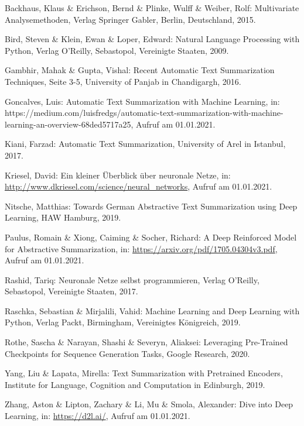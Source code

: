 \setcounter{page}{50}

\begin{thebibliography}{50}
\thispagestyle{fancy}

Backhaus, Klaus \& Erichson, Bernd \& Plinke, Wulff \& Weiber, Rolf: Multivariate Analysemethoden, Verlag Springer Gabler, Berlin, Deutschland, 2015.

Bird, Steven \& Klein, Ewan \& Loper, Edward: Natural Language Processing with Python, Verlag O'Reilly, Sebastopol, Vereinigte Staaten, 2009.

Gambhir, Mahak \& Gupta, Vishal: Recent Automatic Text Summarization Techniques, Seite 3-5, University of Panjab in Chandigargh, 2016.

Goncalves, Luis: Automatic Text Summarization with Machine Learning, in: https://medium.com/luisfredgs/automatic-text-summarization-with-machine-learning-an-overview-68ded5717a25, Aufruf am 01.01.2021.

Kiani, Farzad: Automatic Text Summarization, University of Arel in Istanbul, 2017.

Kriesel, David: Ein kleiner Überblick über neuronale Netze, in: \url{http://www.dkriesel.com/science/neural_networks}, Aufruf am 01.01.2021.

Nitsche, Matthias: Towards German Abstractive Text Summarization using Deep Learning, HAW Hamburg, 2019.

Paulus, Romain \& Xiong, Caiming \& Socher, Richard: A Deep Reinforced Model for Abstractive Summarization, in: \url{https://arxiv.org/pdf/1705.04304v3.pdf}, Aufruf am 01.01.2021.

Rashid, Tariq: Neuronale Netze selbst programmieren, Verlag O'Reilly, Sebastopol, Vereinigte Staaten, 2017.

Raschka, Sebastian \& Mirjalili, Vahid: Machine Learning and Deep Learning with Python, Verlag Packt, Birmingham, Vereinigtes Königreich, 2019.

Rothe, Sascha \& Narayan, Shashi \& Severyn, Aliaksei: Leveraging Pre-Trained Checkpoints for Sequence Generation Tasks, Google Research, 2020.

Yang, Liu \& Lapata, Mirella: Text Summarization with Pretrained Encoders, Institute for Language, Cognition and Computation in Edinburgh, 2019.

Zhang, Aston \& Lipton, Zachary \& Li, Mu \& Smola, Alexander: Dive into Deep Learning, in: \url{https://d2l.ai/}, Aufruf am 01.01.2021.

\end{thebibliography}
